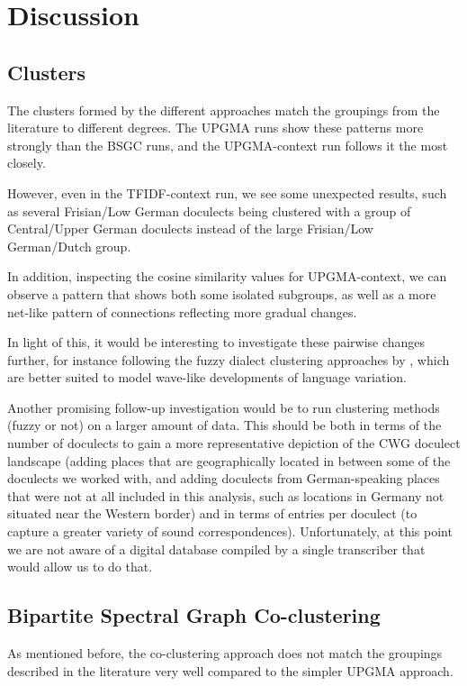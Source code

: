 \documentclass[a4paper]{article}
\begin{document}
\section{Discussion}
\label{sec:discussion}

\subsection{Clusters}
The clusters formed by the different approaches
match the groupings from the literature to different degrees.
The UPGMA runs show these patterns more strongly than the BSGC runs,
and the UPGMA-context run follows it the most closely.

However, even in the TFIDF-context run,
we see some unexpected results,
such as several Frisian/Low German doculects
being clustered with a group of Central/Upper German doculects
instead of the large Frisian/Low German/Dutch group.

In addition, inspecting the cosine similarity values
for UPGMA-context, we can observe a pattern
that shows both some isolated subgroups, as well as
a more net-like pattern of connections
reflecting more gradual changes.

In light of this, it would be interesting
to investigate these pairwise changes further,
for instance following the fuzzy dialect clustering approaches
by \citet{proell2013detecting}, which are better suited to model
wave-like developments of language variation.

Another promising follow-up investigation would be to run
clustering methods (fuzzy or not) on a larger amount of data.
This should be both in terms of the number of doculects
to gain a more representative depiction of the CWG doculect landscape
(adding places that are geographically located
in between some of the doculects we worked with,
and adding doculects from German-speaking places that
were not at all included in this analysis, such as
locations in Germany not situated near the Western border)
and in terms of entries per doculect
(to capture a greater variety of sound correspondences).
Unfortunately, at this point we are not aware of
a digital database compiled by a single transcriber that
would allow us to do that.

\subsection{Bipartite Spectral Graph Co-clustering}

As mentioned before, the co-clustering approach
does not match the groupings described in the literature very well
compared to the simpler UPGMA approach.
\end{document}
